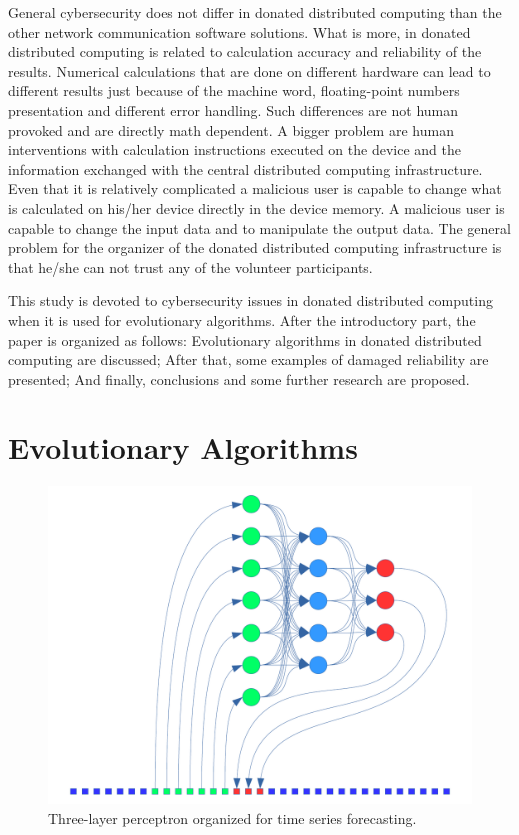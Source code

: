 \documentclass[graybox]{svmult}
\begin{document}
General cybersecurity does not differ in donated distributed computing than the other network communication software solutions. What is more, in donated distributed computing is related to calculation accuracy and reliability of the results. Numerical calculations that are done on different hardware can lead to different results just because of the machine word, floating-point numbers presentation and different error handling. Such differences are not human provoked and are directly math dependent. A bigger problem are human interventions with calculation instructions executed on the device and the information exchanged with the central distributed computing infrastructure. Even that it is relatively complicated a malicious user is capable to change what is calculated on his/her device directly in the device memory. A malicious user is capable to change the input data and to manipulate the output data. The general problem for the organizer of the donated distributed computing infrastructure is that he/she can not trust any of the volunteer participants. 

This study is devoted to cybersecurity issues in donated distributed computing when it is used for evolutionary algorithms. After the introductory part, the paper is organized as follows: Evolutionary algorithms in donated distributed computing are discussed; After that, some examples of damaged reliability are presented; And finally, conclusions and some further research are proposed. 

\section{Evolutionary Algorithms}
\label{sec:02}

\begin{figure}[b]
\sidecaption
\includegraphics[width=\textwidth]{fig02}
\caption{Three-layer perceptron organized for time series forecasting.}
\label{fig:02}
\end{figure}
\end{document}
